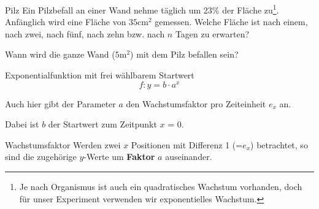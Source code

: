 \begin{beispiel}{Pilz}{}
  Ein Pilzbefall an einer Wand nehme täglich um 23\% der Fläche
  zu\footnote{Je nach Organismus ist auch ein quadratisches Wachstum
  vorhanden, doch für unser Experiment verwenden wir exponentielles Wachstum.}.
  Anfänglich wird eine Fläche von $35 \text{cm}^2$ gemessen.
  Welche Fläche ist nach einem, nach zwei, nach fünf, nach zehn
  bzw. nach $n$ 
  Tagen zu erwarten?


  Wann wird die ganze Wand ($5 \text{m}^2$) mit dem Pilz befallen
  sein?
  

\end{beispiel}

\newpage


\begin{gesetz}{Exponentialfunktion mit frei wählbarem Startwert}{}
$$f: y = b\cdot{}a^x$$

Auch hier gibt der Parameter $a$ den Wachstumsfaktor pro Zeiteinheit $e_x$ an.

Dabei ist $b$ der Startwert zum Zeitpunkt $x$ = 0.
\end{gesetz}



\begin{bemerkung}{Wachstumsfaktor}{}{}
Werden zwei $x$ Positionen mit Differenz 1 (=$e_x$) betrachtet, so sind
die zugehörige $y$-Werte um \textbf{Faktor} $a$ auseinander.
\end{bemerkung}

